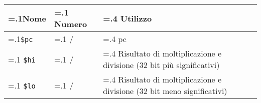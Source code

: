 \documentclass[varwidth=6in]{standalone}
\providecommand\lightrule{%
	\arrayrulecolor{black!30}%
	\midrule[\lightrulewidth]%
	\arrayrulecolor{black}}
\providecommand\register[1]{%
	\texttt{#1}%
}
\begin{document}
\begin{tabularx}{\textwidth}{ >{\hsize=.1\textwidth}X >{\hsize=.1\textwidth}X >{\hsize=.4\textwidth}X X }
	\toprule
		Nome & Numero & Utilizzo \\
	\midrule
		\register{\$pc} & / & \acrfull{pc} \\\lightrule
		\register{\$hi} & / & Risultato di moltiplicazione e divisione (\(32\) bit più significativi)\\\lightrule
		\register{\$lo} & / & Risultato di moltiplicazione e divisione (\(32\) bit meno significativi) \\
	\bottomrule
\end{tabularx}
\end{document}
